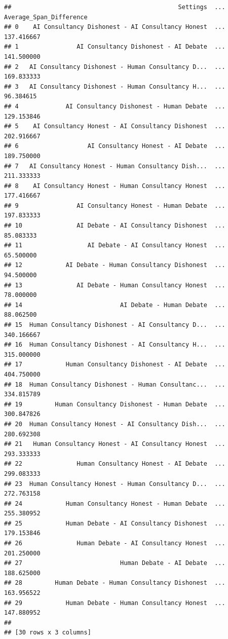 \documentclass[
]{article}
\begin{document}
\begin{verbatim}
##                                              Settings  ...  Average_Span_Difference
## 0    AI Consultancy Dishonest - AI Consultancy Honest  ...               137.416667
## 1                AI Consultancy Dishonest - AI Debate  ...               141.500000
## 2   AI Consultancy Dishonest - Human Consultancy D...  ...               169.833333
## 3   AI Consultancy Dishonest - Human Consultancy H...  ...                96.384615
## 4             AI Consultancy Dishonest - Human Debate  ...               129.153846
## 5    AI Consultancy Honest - AI Consultancy Dishonest  ...               202.916667
## 6                   AI Consultancy Honest - AI Debate  ...               189.750000
## 7   AI Consultancy Honest - Human Consultancy Dish...  ...               211.333333
## 8    AI Consultancy Honest - Human Consultancy Honest  ...               177.416667
## 9                AI Consultancy Honest - Human Debate  ...               197.833333
## 10               AI Debate - AI Consultancy Dishonest  ...                85.083333
## 11                  AI Debate - AI Consultancy Honest  ...                65.500000
## 12            AI Debate - Human Consultancy Dishonest  ...                94.500000
## 13               AI Debate - Human Consultancy Honest  ...                78.000000
## 14                           AI Debate - Human Debate  ...                88.062500
## 15  Human Consultancy Dishonest - AI Consultancy D...  ...               340.166667
## 16  Human Consultancy Dishonest - AI Consultancy H...  ...               315.000000
## 17            Human Consultancy Dishonest - AI Debate  ...               404.750000
## 18  Human Consultancy Dishonest - Human Consultanc...  ...               334.815789
## 19         Human Consultancy Dishonest - Human Debate  ...               300.847826
## 20  Human Consultancy Honest - AI Consultancy Dish...  ...               280.692308
## 21   Human Consultancy Honest - AI Consultancy Honest  ...               293.333333
## 22               Human Consultancy Honest - AI Debate  ...               299.083333
## 23  Human Consultancy Honest - Human Consultancy D...  ...               272.763158
## 24            Human Consultancy Honest - Human Debate  ...               255.380952
## 25            Human Debate - AI Consultancy Dishonest  ...               179.153846
## 26               Human Debate - AI Consultancy Honest  ...               201.250000
## 27                           Human Debate - AI Debate  ...               188.625000
## 28         Human Debate - Human Consultancy Dishonest  ...               163.956522
## 29            Human Debate - Human Consultancy Honest  ...               147.880952
## 
## [30 rows x 3 columns]
\end{verbatim}
\end{document}
